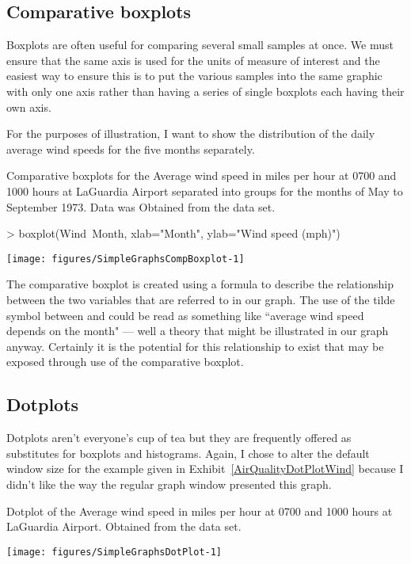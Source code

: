 \subsection{Comparative boxplots}

Boxplots are often useful for comparing several small samples at once. We must ensure that the same axis is used for the units of measure of interest and the easiest way to ensure this is to put the various samples into the same graphic with only one axis rather than having a series of single boxplots each having their own axis.

For the purposes of illustration, I want to show the distribution of the daily average wind speeds for the five months separately. 
\begin{exhibit}
\begin{center}
\caption{Comparative boxplots for the Average wind speed in miles per hour at 0700 and 1000 hours at LaGuardia Airport separated into groups for the months of May to September 1973. Data was Obtained from the  data set.}
\label{AirQualityCompBoxplotWindMonth}
\begin{Schunk}
\begin{Sinput}
> boxplot(Wind~Month, xlab="Month", ylab="Wind speed (mph)")
\end{Sinput}

\texttt{[image: figures/SimpleGraphsCompBoxplot-1]} \end{Schunk}
\end{center}
\end{exhibit}
The comparative boxplot is created using a formula to describe the relationship between the two variables that are referred to in our graph. The use of the tilde symbol between  and  could be read as something like ``average wind speed depends on the month" --- well a theory that might be illustrated in our graph anyway. Certainly it is the potential for this relationship to exist that may be exposed through use of the comparative boxplot.

\subsection{Dotplots}

Dotplots aren't everyone's cup of tea but they are frequently offered as substitutes for boxplots and histograms. Again, I chose to alter the default window size for the example given in Exhibit~\ref{AirQualityDotPlotWind}
because I didn't like the way the regular graph window presented this graph.
\begin{exhibit}
\begin{center}
\caption{Dotplot of the Average wind speed in miles per hour at 0700 and 1000 hours at LaGuardia Airport. Obtained from the  data set.}
\label{AirQualityDotPlotWind}
\begin{Schunk}

\texttt{[image: figures/SimpleGraphsDotPlot-1]} \end{Schunk}
\end{center}
\end{exhibit}


